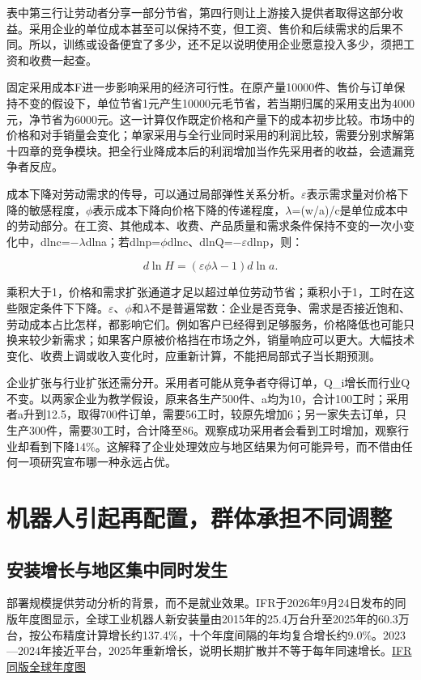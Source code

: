 \documentclass[UTF8,fontset=windows,12pt,a4paper,oneside,openany]{ctexbook}
\begin{document}
表中第三行让劳动者分享一部分节省，第四行则让上游接入提供者取得这部分收益。采用企业的单位成本甚至可以保持不变，但工资、售价和后续需求的后果不同。所以，训练或设备便宜了多少，还不足以说明使用企业愿意投入多少，须把工资和收费一起查。

固定采用成本F进一步影响采用的经济可行性。在原产量10000件、售价与订单保持不变的假设下，单位节省1元产生10000元毛节省，若当期归属的采用支出为4000元，净节省为6000元。这一计算仅作既定价格和产量下的成本初步比较。市场中的价格和对手销量会变化；单家采用与全行业同时采用的利润比较，需要分别求解第十四章的竞争模块。把全行业降成本后的利润增加当作先采用者的收益，会遗漏竞争者反应。

成本下降对劳动需求的传导，可以通过局部弹性关系分析。\ensuremath{\varepsilon}表示需求量对价格下降的敏感程度，\ensuremath{\phi}表示成本下降向价格下降的传递程度，\ensuremath{\lambda}=(w/a)/c是单位成本中的劳动部分。在工资、其他成本、收费、产品质量和需求条件保持不变的一次小变化中，dlnc=\ensuremath{-}\ensuremath{\lambda}dlna；若dlnp=\ensuremath{\phi}dlnc、dlnQ=\ensuremath{-}\ensuremath{\varepsilon}dlnp，则：

\[
d\ln H=(\varepsilon\phi\lambda-1)d\ln a.
\tag{5.5}
\]

乘积大于1，价格和需求扩张通道才足以超过单位劳动节省；乘积小于1，工时在这些限定条件下下降。\ensuremath{\varepsilon}、\ensuremath{\phi}和\ensuremath{\lambda}不是普遍常数：企业是否竞争、需求是否接近饱和、劳动成本占比怎样，都影响它们。例如客户已经得到足够服务，价格降低也可能只换来较少新需求；如果客户原被价格挡在市场之外，销量响应可以更大。大幅技术变化、收费上调或收入变化时，应重新计算，不能把局部式子当长期预测。

企业扩张与行业扩张还需分开。采用者可能从竞争者夺得订单，Q\_i增长而行业Q不变。以两家企业为教学假设，原来各生产500件、a均为10，合计100工时；采用者a升到12.5，取得700件订单，需要56工时，较原先增加6；另一家失去订单，只生产300件，需要30工时，合计降至86。观察成功采用者会看到工时增加，观察行业却看到下降14\%。这解释了企业处理效应与地区结果为何可能异号，而不借由任何一项研究宣布哪一种永远占优。

\section{机器人引起再配置，群体承担不同调整}

\subsection{安装增长与地区集中同时发生}

部署规模提供劳动分析的背景，而不是就业效果。IFR于2026年9月24日发布的同版年度图显示，全球工业机器人新安装量由2015年的25.4万台升至2025年的60.3万台，按公布精度计算增长约137.4\%，十个年度间隔的年均复合增长约9.0\%。2023—2024年接近平台，2025年重新增长，说明长期扩散并不等于每年同速增长。\href{https://ifr.org/downloads/press_docs/Graphic_World_Robotics_2026_GLOBAL.png}{IFR同版全球年度图}
\end{document}

